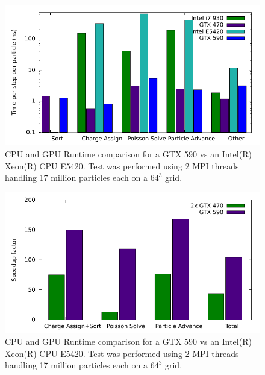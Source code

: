 \noindent \begin{figure}
\begin{center}
\includegraphics[width=6in]{performance/architecture_compare.pdf}
\end{center}
\caption{CPU and GPU Runtime comparison for a GTX 590 vs an Intel(R) Xeon(R) CPU E5420. Test was performed using 2 MPI threads handling 17 million particles each on a $64^3$ grid.}
\label{tab:speedup2} 
\end{figure} 

\noindent \begin{figure}
\begin{center}
\includegraphics[width=6in]{performance/architecture_speedup_compare.pdf}
\end{center}
\caption{CPU and GPU Runtime comparison for a GTX 590 vs an Intel(R) Xeon(R) CPU E5420. Test was performed using 2 MPI threads handling 17 million particles each on a $64^3$ grid.}
\label{tab:speedup2} 
\end{figure} 




